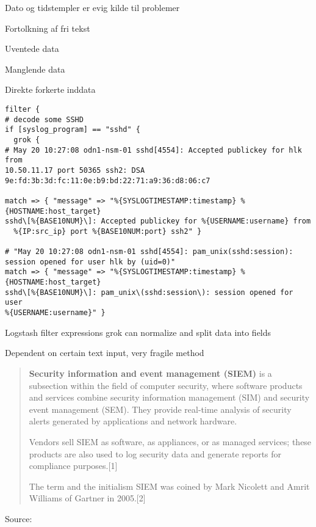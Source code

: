 \documentclass[Screen16to9,17pt]{foils}
\begin{document}
\begin{list2}
\item Dato og tidstempler er evig kilde til problemer
\item Fortolkning af fri tekst
\item Uventede data
\item Manglende data
\item Direkte forkerte inddata
\end{list2}



{\footnotesize
\begin{verbatim}
filter {
# decode some SSHD
if [syslog_program] == "sshd" {
  grok {
# May 20 10:27:08 odn1-nsm-01 sshd[4554]: Accepted publickey for hlk from
10.50.11.17 port 50365 ssh2: DSA 9e:fd:3b:3d:fc:11:0e:b9:bd:22:71:a9:36:d8:06:c7

match => { "message" => "%{SYSLOGTIMESTAMP:timestamp} %{HOSTNAME:host_target}
sshd\[%{BASE10NUM}\]: Accepted publickey for %{USERNAME:username} from
  %{IP:src_ip} port %{BASE10NUM:port} ssh2" }

# "May 20 10:27:08 odn1-nsm-01 sshd[4554]: pam_unix(sshd:session):
session opened for user hlk by (uid=0)"
match => { "message" => "%{SYSLOGTIMESTAMP:timestamp} %{HOSTNAME:host_target}
sshd\[%{BASE10NUM}\]: pam_unix\(sshd:session\): session opened for user
%{USERNAME:username}" }
\end{verbatim}
}

\begin{list2}
\item Logstash filter expressions grok can normalize and split data into fields
\item Dependent on certain text input, very fragile method
\end{list2}








\begin{quote}
{\bf Security information and event management (SIEM)} is a subsection within the field of computer security, where software products and services combine security information management (SIM) and security event management (SEM). They provide real-time analysis of security alerts generated by applications and network hardware.

  Vendors sell SIEM as software, as appliances, or as managed services; these products are also used to log security data and generate reports for compliance purposes.[1]

  The term and the initialism SIEM was coined by Mark Nicolett and Amrit Williams of Gartner in 2005.[2]
\end{quote}
Source: 
\end{document}
